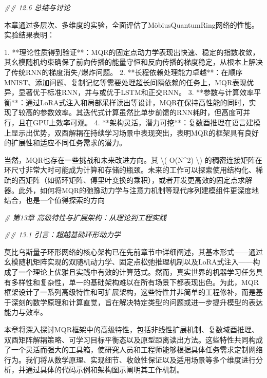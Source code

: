 \documentclass[
  12pt,
]{article}
\newenvironment{Shaded}{}{}
\newcommand{\CommentTok}[1]{\textcolor[rgb]{0.38,0.63,0.69}{\textit{#1}}}
\newcommand{\DecValTok}[1]{\textcolor[rgb]{0.25,0.63,0.44}{#1}}
\newcommand{\FloatTok}[1]{\textcolor[rgb]{0.25,0.63,0.44}{#1}}
\newcommand{\NormalTok}[1]{#1}
\newcommand{\OperatorTok}[1]{\textcolor[rgb]{0.40,0.40,0.40}{#1}}
\begin{document}
\begin{Shaded}
\begin{Highlighting}[]
\CommentTok{\#\# 12.6 总结与讨论}

\NormalTok{本章通过多层次、多维度的实验，全面评估了MöbiusQuantumRing网络的性能。实验结果表明：}

\FloatTok{1.}  \OperatorTok{**}\NormalTok{理论性质得到验证}\OperatorTok{**}\NormalTok{：MQR的固定点动力学表现出快速、稳定的指数收敛，其幺模随机约束确保了前向传播的能量守恒和反向传播的梯度稳定，从根本上解决了传统RNN的梯度消失}\OperatorTok{/}\NormalTok{爆炸问题。}
\FloatTok{2.}  \OperatorTok{**}\NormalTok{长程依赖处理能力卓越}\OperatorTok{**}\NormalTok{：在顺序MNIST、添加问题、复制记忆等需要处理超长间隔依赖的任务上，MQR表现优异，显著优于标准RNN，并与或优于LSTM和正交RNN。}
\FloatTok{3.}  \OperatorTok{**}\NormalTok{参数与计算效率平衡}\OperatorTok{**}\NormalTok{：通过LoRA式注入和局部采样读出等设计，MQR在保持高性能的同时，实现了较高的参数效率。其迭代式计算虽然比单步前馈的RNN耗时，但高度可并行，且在GPU上效率可观。}
\FloatTok{4.}  \OperatorTok{**}\NormalTok{架构灵活，潜力可挖}\OperatorTok{**}\NormalTok{：复数酉推理在语言建模上显示出优势，双酉解耦在持续学习场景中表现突出，表明MQR的框架具有良好的扩展性和适应不同任务需求的潜力。}

\NormalTok{当然，MQR也存在一些挑战和未来改进方向。其 }\OperatorTok{\textbackslash{}}\NormalTok{( O(N}\OperatorTok{\^{}}\DecValTok{2}\NormalTok{) }\OperatorTok{\textbackslash{}}\NormalTok{) 的稠密连接矩阵在环尺寸非常大时可能成为计算和存储的瓶颈。未来的工作可以探索使用结构化、稀疏的酉矩阵（如循环矩阵、傅里叶变换的乘积），或者开发更高效的固定点求解器。此外，如何将MQR的弛豫动力学与注意力机制等现代序列建模组件更深度地结合，也是一个值得探索的方向}

\CommentTok{\# 第13章 高级特性与扩展架构：从理论到工程实践}

\CommentTok{\#\# 13.1 引言：超越基础环形动力学}

\NormalTok{莫比乌斯量子环形网络的核心架构已在先前章节中详细阐述，其基本形式——通过幺模随机矩阵实现的双随机动力学、固定点松弛推理机制以及LoRA式注入——构成了一个理论上优雅且实践中有效的计算范式。然而，真实世界的机器学习任务具有多样性和复杂性，单一的基础架构难以在所有场景下都表现出色。为此，MQR框架设计了一系列高级特性和可扩展架构，这些特性并非简单的工程修补，而是基于深刻的数学原理和计算直觉，旨在解决特定类型的问题或进一步提升模型的表达能力与效率。}

\NormalTok{本章将深入探讨MQR框架中的高级特性，包括非线性扩展机制、复数域酉推理、双酉矩阵解耦策略、可学习目标平衡态以及原型距离读出方法。这些特性共同构成了一个灵活而强大的工具箱，使研究人员和工程师能够根据具体任务需求定制网络行为。我们将从数学原理、实现细节、收敛性保证以及适用场景等多个维度进行分析，并通过具体的代码示例和架构图示阐明其工作机制。}


\end{Highlighting}
\end{Shaded}
\end{document}
